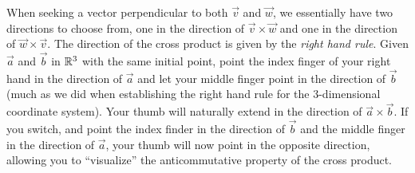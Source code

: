 \documentclass{ximera}
\begin{document}
When seeking a vector perpendicular to both $\vec v$ and $\vec w$, we
essentially have two directions to choose from, one in the direction
of $\vec{v}\times\vec{w}$ and one in the direction of
$\vec{w}\times\vec{v}$.  The direction of the cross product is given
by the \textit{right hand rule}.  Given $\vec{a}$ and $\vec{b}$ in
$\mathbb R^3$ with the same initial point, point the index finger of your
right hand in the direction of $\vec{a}$ and let your middle finger
point in the direction of $\vec{b}$ (much as we did when establishing
the right hand rule for the 3-dimensional coordinate system). Your
thumb will naturally extend in the direction of
$\vec{a}\times\vec{b}$.  If you switch, and point the index finder in
the direction of $\vec{b}$ and the middle finger in the direction of
$\vec{a}$, your thumb will now point in the opposite direction,
allowing you to ``visualize'' the anticommutative property of the
cross product.
\end{document}

